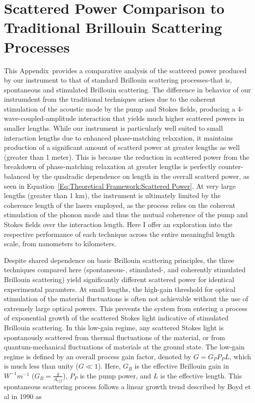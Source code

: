 \newpage


\section{Scattered Power Comparison to Traditional Brillouin Scattering Processes}
\label{appendix:comparison}

This Appendix~provides a comparative analysis of the scattered power produced by our instrument to that of standard Brillouin scattering processes-that is, spontaneous and stimulated Brillouin scattering. The difference in behavior of our instrumdent from the traditional techniques arises due to the coherent stimulation of the acoustic mode by the pump and Stokes fields, producing a 4-wave-coupled-amplitude interaction that yields much higher scattered powers in smaller lengths. While our instrument is particularly well suited to small interaction lengths due to enhanced phase-matching relaxation, it maintains production of a significant amount of scatterd power at greater lengths as well (greater than 1 meter). This is because the reduction in scattered power from the breakdown of phase-matching relaxation at greater lengths is perfectly counter-balanced by the quadradic dependence on length in the overall scatterd power, as seen in Equation~\ref{Eq:Theoretical Framework:Scattered Power}. At very large lengths (greater than 1 km), the instrument is ultimately limited by the coherence length of the lasers employed, as the process relies on the coherent stimulation of the phonon mode and thus the mutual coherence of the pump and Stokes fields over the interaction length. Here I offer an exploration into the respective performance of each technique across the entire meaningful length scale, from nanometers to kilometers.

Despite shared dependence on basic Brillouin scattering principles, the three techniques compared here (spontaneous-, stimulated-, and coherently stimulated Brillouin scattering) yield significantly different scattered power for identical experimental paramters. At small lengths, the high-gain threshold for optical stimulation of the material fluctuations is often not achievable without the use of extremely large optical powers. This prevents the system from entering a process of exponential growth of the scattered Stokes light indicative of stimulated Brillouin scattering.\cite{boyd2020nonlinear} In this low-gain regime, any scattered Stokes light is spontanously scattered from thermal fluctuations of the material, or from quantum-mechanical fluctuations of materials at the ground state. The low-gain regime is defined by an overall process gain factor, denoted by $G = G_{P}P_{P}L$, which is much less than unity ($G \ll 1$). Here, $G_{B}$ is the effective Brillouin gain in $W^{-1}m^{-1}$ ($G_{B} = \frac{g}{A_{eff}}$), $P_{P}$ is the pump power, and $L$ is the effective length. This spontaneous scattering process follows a linear growth trend described by Boyd et al in 1990\cite{boyd1990noise} as

